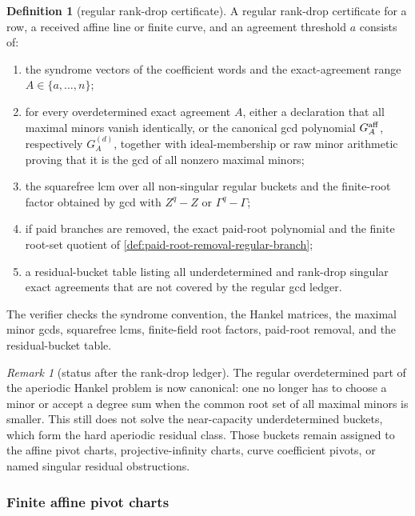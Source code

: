 \documentclass[11pt]{article}
\theoremstyle{definition}
\newtheorem{definition}[definition]{Definition}
\theoremstyle{remark}
\newtheorem{remark}[remark]{Remark}
\begin{document}
\begin{definition}[regular rank-drop certificate]
\label{def:regular-rankdrop-certificate}
A regular rank-drop certificate for a row, a received affine line or finite
curve, and an agreement threshold $a$ consists of:
\begin{enumerate}[label=\textup{(\roman*)},leftmargin=2.2em]
\item the syndrome vectors of the coefficient words and the exact-agreement range
$A\in\{a,\ldots,n\}$;
\item for every overdetermined exact agreement $A$, either a declaration that all
maximal minors vanish identically, or the canonical gcd polynomial
$G_A^{\rm aff}$, respectively $G_A^{(d)}$, together with ideal-membership or raw
minor arithmetic proving that it is the gcd of all nonzero maximal minors;
\item the squarefree lcm over all non-singular regular buckets and the finite-root
factor obtained by gcd with $Z^q-Z$ or $\Gamma^q-\Gamma$;
\item if paid branches are removed, the exact paid-root polynomial and the finite
root-set quotient of \cref{def:paid-root-removal-regular-branch};
\item a residual-bucket table listing all underdetermined and rank-drop singular
exact agreements that are not covered by the regular gcd ledger.
\end{enumerate}
The verifier checks the syndrome convention, the Hankel matrices, the maximal
minor gcds, squarefree lcms, finite-field root factors, paid-root removal, and the
residual-bucket table.
\end{definition}

\begin{remark}[status after the rank-drop ledger]
\label{rem:rankdrop-ledger-status}
The regular overdetermined part of the aperiodic Hankel problem is now canonical:
one no longer has to choose a minor or accept a degree sum when the common root
set of all maximal minors is smaller.  This still does not solve the near-capacity
underdetermined buckets, which form the hard aperiodic residual class.
Those buckets remain assigned to the affine pivot charts, projective-infinity
charts, curve coefficient pivots, or named singular residual obstructions.
\end{remark}

\subsubsection{Finite affine pivot charts}
\end{document}
